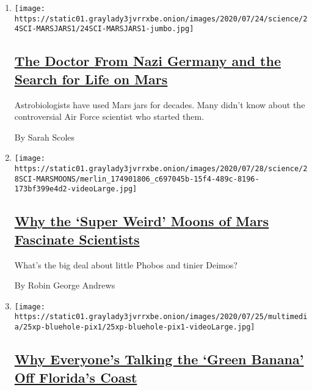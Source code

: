 \begin{enumerate}
\def\labelenumi{\arabic{enumi}.}
\item
  \texttt{[image: https://static01.graylady3jvrrxbe.onion/images/2020/07/24/science/24SCI-MARSJARS1/24SCI-MARSJARS1-jumbo.jpg]}

  \hypertarget{the-doctor-from-nazi-germany-and-the-search-for-life-on-mars}{%
  \subsection{\texorpdfstring{\href{/2020/07/24/science/mars-jars-strughold.html}{The
  Doctor From Nazi Germany and the Search for Life on
  Mars}}{The Doctor From Nazi Germany and the Search for Life on Mars}}\label{the-doctor-from-nazi-germany-and-the-search-for-life-on-mars}}

  Astrobiologists have used Mars jars for decades. Many didn't know
  about the controversial Air Force scientist who started them.

  By Sarah Scoles
\item
  \texttt{[image: https://static01.graylady3jvrrxbe.onion/images/2020/07/28/science/28SCI-MARSMOONS/merlin\_174901806\_c697045b-15f4-489c-8196-173bf399e4d2-videoLarge.jpg]}

  \hypertarget{why-the-super-weird-moons-of-mars-fascinate-scientists}{%
  \subsection{\texorpdfstring{\href{/2020/07/25/science/mars-moons-phobos-deimos.html}{Why
  the `Super Weird' Moons of Mars Fascinate
  Scientists}}{Why the `Super Weird' Moons of Mars Fascinate Scientists}}\label{why-the-super-weird-moons-of-mars-fascinate-scientists}}

  What's the big deal about little Phobos and tinier Deimos?

  By Robin George Andrews
\item
  \texttt{[image: https://static01.graylady3jvrrxbe.onion/images/2020/07/25/multimedia/25xp-bluehole-pix1/25xp-bluehole-pix1-videoLarge.jpg]}

  \hypertarget{why-everyones-talking-the-green-banana-off-floridas-coast}{%
  \subsection{\texorpdfstring{\href{/2020/07/25/science/blue-hole-florida-ocean.html}{Why
  Everyone's Talking the `Green Banana' Off Florida's
  Coast}}{Why Everyone's Talking the `Green Banana' Off Florida's Coast}}\label{why-everyones-talking-the-green-banana-off-floridas-coast}}


\end{enumerate}
